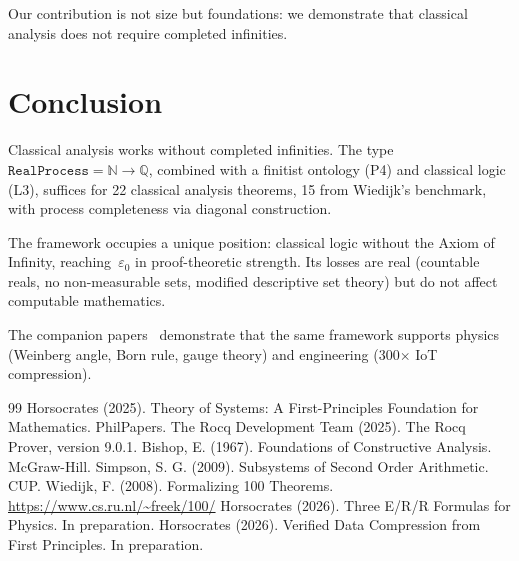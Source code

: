 \documentclass[11pt,a4paper]{article}
\theoremstyle{definition}
\theoremstyle{remark}
\newcommand{\RP}{\texttt{RealProcess}}
\newcommand{\natQ}{\mathbb{N} \to \mathbb{Q}}
\begin{document}
Our contribution is not size but foundations: we demonstrate that classical analysis does not require completed infinities.


\section{Conclusion}
\label{sec:conclusion}

Classical analysis works without completed infinities.  The type $\RP = \natQ$, combined with a finitist ontology (P4) and classical logic (L3), suffices for 22 classical analysis theorems, 15 from Wiedijk's benchmark, with process completeness via diagonal construction.

The framework occupies a unique position: classical logic without the Axiom of Infinity, reaching~$\varepsilon_0$ in proof-theoretic strength.  Its losses are real (countable reals, no non-measurable sets, modified descriptive set theory) but do not affect computable mathematics.

The companion papers~\cite{physics_paper,compression_paper} demonstrate that the same framework supports physics (Weinberg angle, Born rule, gauge theory) and engineering (300$\times$ IoT compression).


\begin{thebibliography}{99}
 Horsocrates (2025). Theory of Systems: A First-Principles Foundation for Mathematics. PhilPapers.
 The Rocq Development Team (2025). The Rocq Prover, version 9.0.1.
 Bishop, E. (1967). Foundations of Constructive Analysis. McGraw-Hill.
 Simpson, S. G. (2009). Subsystems of Second Order Arithmetic. CUP.
 Wiedijk, F. (2008). Formalizing 100 Theorems. \url{https://www.cs.ru.nl/~freek/100/}
 Horsocrates (2026). Three E/R/R Formulas for Physics. In preparation.
 Horsocrates (2026). Verified Data Compression from First Principles. In preparation.
\end{thebibliography}
\end{document}
